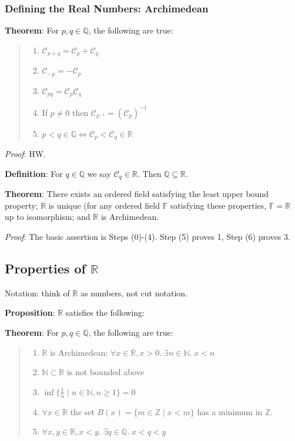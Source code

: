\documentclass[11pt]{article}
\begin{document}
\subsubsection{Defining the Real Numbers: Archimedean}

\textbf{Theorem}: For $p,q \in \mathbb{Q}$, the following are true:
\begin{quote}\vspace{-0.3cm}
	\begin{enumerate}
	\item $\mathcal{C}_{p+q} = \mathcal{C}_p + \mathcal{C}_q$
	\item $\mathcal{C}_{-p} = -\mathcal{C}_p$
	\item $\mathcal{C}_{pq} = \mathcal{C}_p \mathcal{C}_q$
	\item If $p \neq 0$ then $\mathcal{C}_{p^{-1}} = (\mathcal{C}_p)^{-1}$
	\item $p < q \in \mathbb{Q} \iff \mathcal{C}_p < \mathcal{C}_q \in \mathbb{R}$
	\end{enumerate}
\end{quote}
\emph{Proof}: HW.

\textbf{Definition}: For $q \in \mathbb{Q}$ we say $\mathcal{C}_q \in \mathbb{R}$. Then $\mathbb{Q} \subseteq \mathbb{R}$.

\textbf{Theorem}: There exists an ordered field satisfying the least upper bound property; $\mathbb{R}$ is unique (for any ordered field $\mathbb{F}$ satisfying these properties, $\mathbb{F} = \mathbb{R}$ up to isomorphism; and $\mathbb{R}$ is Archimedean.

\emph{Proof}: The basic assertion is Steps (0)-(4). Step (5) proves 1, Step (6) proves 3.

\subsection{Properties of $\mathbb{R}$}

Notation: think of $\mathbb{R}$ as numbers, not cut notation.

\textbf{Proposition}: $\mathbb{R}$ satisfies the following:

\textbf{Theorem}: For $p,q \in \mathbb{Q}$, the following are true:
\begin{quote}\vspace{-0.3cm}
	\begin{enumerate}
	\item $\mathbb{R}$ is Archimedean: $\forall x \in \mathbb{R}, x > 0.\; \exists n \in \mathbb{N}.\; x < n$
	\item $\mathbb{N} \subset \mathbb{R}$ is not bounded above
	\item $\inf\{\frac{1}{n} \;|\; n \in \mathbb{N}, n \geq 1\} = 0$
	\item $\forall x \in \mathbb{R}$ the set $B(x) = \{m \in \mathbb{Z} \;|\; x < m\}$ has a minimum in $\mathbb{Z}$.
	\item $\forall x,y \in \mathbb{R}, x < y.\; \exists q \in \mathbb{Q}.\; x < q < y$
	\end{enumerate}
\end{quote}
\end{document}
